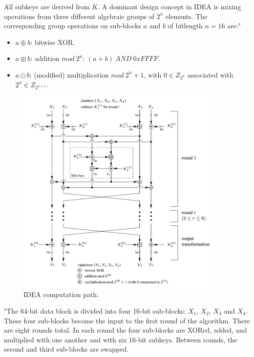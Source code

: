 \documentclass[a4paper,12pt,titlepage]{article}
\begin{document}
All subkeys are derived from $K$. A dominant design concept in IDEA is mixing operations from three different algebraic groups of $2^n$ elements. The corresponding group operations on sub-blocks $a$ and $b$ of bitlength $n = 16$ are:" \citep{menezes_handbook_1996} 
\begin{itemize}[noitemsep]
	\item $a \oplus b$: bitwise XOR. 
	\item $a \boxplus b$: addition $mod\ 2^n$: $(a+b)\ AND\ 0xFFFF$.
	\item $a \odot b$: (modified) multiplication $mod\ 2^n+1$, with $0 \in Z_{2^n}$ associated with $2^n \in Z_{2^{n+1}}$.
\end{itemize}

\begin{figure}[!ht]
	\centering
	\label{fig:idea}
	\includegraphics[width=0.92\textwidth]{idea.png}
	\caption{IDEA computation path. \citep{menezes_handbook_1996}}
\end{figure}

"The 64-bit data block is divided into four 16-bit sub-blocks: $X_1$, $X_2$, $X_3$ and $X_4$. These four sub-blocks become the input to the first round of the algorithm. There are eight rounds total. In each round the four sub-blocks are XORed, added, and multiplied with one another and with six 16-bit subkeys. Between rounds, the second and third sub-blocks are swapped. 
\end{document}
